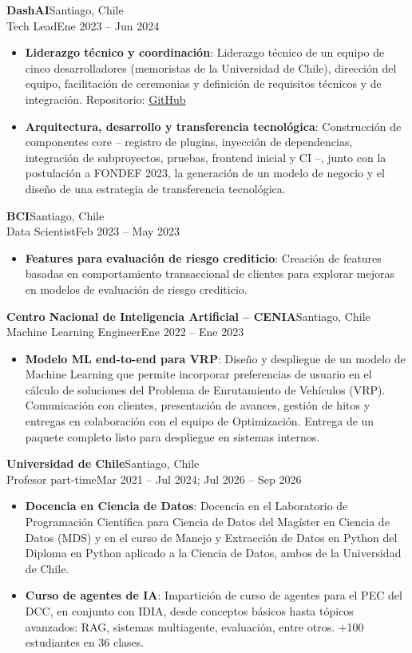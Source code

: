 \documentclass[letterpaper,11pt]{article}
\newcommand{\resumeItem}[2]{
  \item\small{
    \textbf{#1}{: #2\vspace{-2pt}}
  }
}
\newcommand{\resumeSubheading}[4]{%
  \Needspace{7\baselineskip}\vspace{-1pt}\item[]%
    \textbf{#1}\hfill{\small\color{meta}#2}\\[1pt]
    {\small #3}\hfill{\small\color{meta}#4}\vspace{-5pt}%
}
\newcommand{\resumeItemListStart}{\begin{itemize}}
\newcommand{\resumeItemListEnd}{\end{itemize}\vspace{-5pt}}
\begin{document}
    \resumeSubheading
      {DashAI}{Santiago, Chile}
      {Tech Lead}{Ene 2023 -- Jun 2024}
      \resumeItemListStart
        \resumeItem{Liderazgo técnico y coordinación}
          {Liderazgo técnico de un equipo de cinco desarrolladores (memoristas de la Universidad de Chile), dirección del equipo, facilitación de ceremonias y definición de requisitos técnicos y de integración. Repositorio: \href{https://github.com/DashAISoftware/DashAI}{GitHub}}
        \resumeItem{Arquitectura, desarrollo y transferencia tecnológica}
          {Construcción de componentes core -- registro de plugins, inyección de dependencias, integración de subproyectos, pruebas, frontend inicial y CI --, junto con la postulación a FONDEF 2023, la generación de un modelo de negocio y el diseño de una estrategia de transferencia tecnológica.}
      \resumeItemListEnd

    \resumeSubheading
      {BCI}{Santiago, Chile}
      {Data Scientist}{Feb 2023 -- May 2023}
      \resumeItemListStart
        \resumeItem{Features para evaluación de riesgo crediticio}
          {Creación de features basadas en comportamiento transaccional de clientes para explorar mejoras en modelos de evaluación de riesgo crediticio.}
      \resumeItemListEnd

    \resumeSubheading
      {Centro Nacional de Inteligencia Artificial -- CENIA}{Santiago, Chile}
      {Machine Learning Engineer}{Ene 2022 -- Ene 2023}
      \resumeItemListStart
        \resumeItem{Modelo ML end-to-end para VRP}
          {Diseño y despliegue de un modelo de Machine Learning que permite incorporar preferencias de usuario en el cálculo de soluciones del Problema de Enrutamiento de Vehículos (VRP). Comunicación con clientes, presentación de avances, gestión de hitos y entregas en colaboración con el equipo de Optimización. Entrega de un paquete completo listo para despliegue en sistemas internos.}
      \resumeItemListEnd

    \resumeSubheading
      {Universidad de Chile}{Santiago, Chile}
      {Profesor part-time}{Mar 2021 -- Jul 2024; Jul 2026 -- Sep 2026}
      \resumeItemListStart
        \resumeItem{Docencia en Ciencia de Datos}
          {Docencia en el Laboratorio de Programación Científica para Ciencia de Datos del Magíster en Ciencia de Datos (MDS) y en el curso de Manejo y Extracción de Datos en Python del Diploma en Python aplicado a la Ciencia de Datos, ambos de la Universidad de Chile.}
        \resumeItem{Curso de agentes de IA}
          {Impartición de curso de agentes para el PEC del DCC, en conjunto con IDIA, desde conceptos básicos hasta tópicos avanzados: RAG, sistemas multiagente, evaluación, entre otros. +100 estudiantes en 36 clases.}
      \resumeItemListEnd
\end{document}
